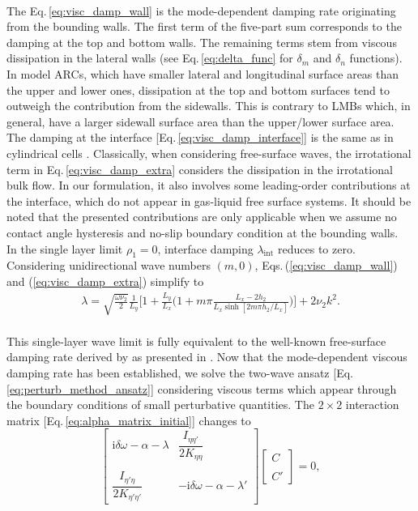 \documentclass[aps,prfluids,reprint,superscriptaddress]{revtex4-2}
\newcommand{\ii}[1]{\text{#1}}
\begin{document}
\\
\indent The Eq.\,\eqref{eq:visc_damp_wall} is the mode-dependent damping rate originating from the bounding walls. The first term of the five-part sum corresponds to the damping at the top and bottom walls. The remaining terms stem from viscous dissipation in the lateral walls (see Eq.\,\eqref{eq:delta_func} for $\delta_m$ and $\delta_n$ functions). In model ARCs, which have smaller lateral and longitudinal surface areas than the upper and lower ones, dissipation at the top and bottom  surfaces tend to outweigh the contribution from the sidewalls. This is contrary to LMBs which, in general, have a larger sidewall surface area than the upper/lower surface area. The damping at the interface [Eq.\,\eqref{eq:visc_damp_interface}] is the same as in cylindrical cells \citep{Herreman2019}. Classically, when considering free-surface waves, the irrotational term in Eq.\,\eqref{eq:visc_damp_extra} considers the dissipation in the irrotational bulk flow. In our formulation, it also involves some leading-order contributions at the interface, which do not appear in gas-liquid free surface systems. It should be noted that the presented contributions are only applicable when we assume no contact angle hysteresis and no-slip boundary condition at the bounding walls.   
\\
\indent In the single layer limit $\rho_1=0$, interface damping $\lambda_{\ii{int}}$ reduces to zero. Considering unidirectional wave numbers $(m,0)$, Eqs.\,(\ref{eq:visc_damp_wall}) and (\ref{eq:visc_damp_extra}) simplify to 
\begin{align}
	\lambda = \sqrt{\frac{\omega\nu_2}{2}}
	\frac{1}{L_y} \Biggl[ 1 + \frac{L_y}{L_x} \biggl( 1 + 
	m\pi \frac{L_x-2h_2}{L_x\sinh{[2m\pi h_2/L_x]}}
	\biggr)
	\Biggr]  +2\nu_2k^2 . 
	\label{eq:damp_1L_wall}
\end{align}   
\\
\indent This single-layer wave limit is fully equivalent to the well-known free-surface damping rate derived by \citet{Keulegan1959} as presented in \cite[chapter~6]{Faltinsen2009}. Now that the mode-dependent viscous damping rate has been established, we solve the two-wave ansatz [Eq.\,\eqref{eq:perturb_method_ansatz}] considering viscous terms which appear through the boundary conditions of small perturbative quantities. The $2\times 2$ interaction matrix [Eq.\,\eqref{eq:alpha_matrix_initial}] changes to
\begin{equation}
	\begin{bmatrix}
		\ii{i}\delta\omega -\alpha -\lambda & \dfrac{I_{\eta\eta'}}{2K_{\eta\eta}} \\
		\\
		\dfrac{I_{\eta'\!\eta}}{2K_{\eta'\!\eta'}} & - \ii{i}\delta\omega -\alpha -\lambda'
	\end{bmatrix}
	\begin{bmatrix}
		C \\
		\\
		C'
	\end{bmatrix}
	= 0 ,
	\label{eq:alpha_matrix_visc}
\end{equation}
\end{document}
